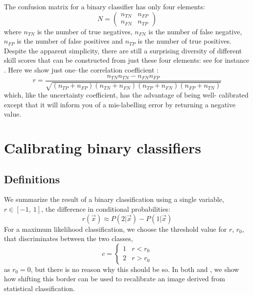 \documentclass{article}
\begin{document}
The confusion matrix for a binary classifier has only four elements:
\begin{equation}
	N = \left ( \begin{array}{cc}
		n_{TN} & n_{FP} \\
		n_{FN} & n_{TP}
	\end{array} \right )
\end{equation}
where $n_{TN}$ is the number of true negatives, $n_{FN}$ is the number of
false negative, $n_{FP}$ is the number of false positives and $n_{TP}$ is
the number of true positives.
Despite the apparent simplicity, there are still a surprising diversity of
different skill scores that can be constructed from just these four elements:
see for instance \citet{Jolliffe_Stephenson2003}.
Here we show just one--the correlation coefficient \citep{Mills2004}:
\begin{equation}
	r = \frac{n_{TN} n_{TN} - n_{FN} n_{FP}}
	{\sqrt{(n_{TP}+n_{FP})(n_{TN}+n_{FN})(n_{TP}+n_{FN})(n_{FP}+n_{TN})}}
\end{equation}
which, like the uncertainty coefficient, has the advantage of being well-
calibrated except that it will inform you of a mis-labelling error by returning
a negative value.


\section{Calibrating binary classifiers}

\subsection{Definitions}

We summarize the result of a binary classification using a single variable, 
$r \in [-1, ~1]$, the difference in conditional probabilities:
\begin{equation}
	r(\vec x) \approx P(2|\vec x) - P(1|\vec x)
\end{equation}
For a maximum
likelihood classification, we choose the threshold value for $r$, $r_0$,
that discriminates between the two classes,
\begin{equation}
c = \left \lbrace
\begin{array}{lr}
1 & r<r_0 \\
2 & r>r_0
\end{array}
\right .
\end{equation}
as $r_0 = 0$, but there is no reason why this should be so.  
In both \citet{Mills2009} and \citet{Mills2011}, we show how shifting this
border can be used to recalibrate an image derived from statistical
classification.
\end{document}

